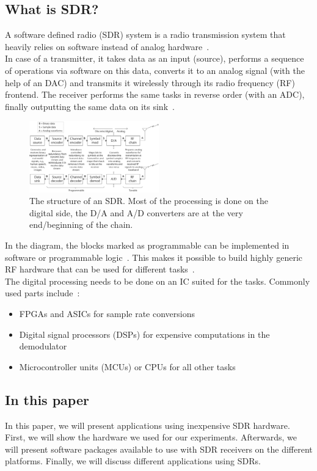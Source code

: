 \documentclass[conference]{IEEEtran}
\begin{document}
\subsection{What is SDR?}
A software defined radio (SDR) system is a radio transmission system that heavily relies on software instead of analog hardware~\cite{Heuberger2017}.\\
In case of a transmitter, it takes data as an input (source), performs a sequence of operations via software on this data, converts it to an analog signal (with the help of an DAC) and transmits it wirelessly through its radio frequency (RF) frontend. The receiver performs the same tasks in reverse order (with an ADC), finally outputting the same data on its sink~\cite[5pp]{wyglinski2018software}.
\begin{figure}[H]
	\centering
	\includegraphics[width=0.5\textwidth]{forEngineers_SDR_structure}
	\caption{The structure of an SDR. Most of the processing is done on the digital side, the D/A and A/D converters are at the very end/beginning of the chain.}
\end{figure}
In the diagram, the blocks marked as programmable can be implemented in software or programmable logic~\cite[5p]{wyglinski2018software}. This makes it possible to build highly generic RF hardware that can be used for different tasks~\cite[4p]{wyglinski2018software}.\\ 
The digital processing needs to be done on an IC suited for the tasks. Commonly used parts include~\cite[3p]{Heuberger2017}:
\begin{itemize}
	\item FPGAs and ASICs for sample rate conversions
	\item Digital signal processors (DSPs) for expensive computations in the demodulator
	\item Microcontroller units (MCUs) or CPUs for all other tasks
\end{itemize}
\subsection{In this paper}
In this paper, we will present applications using inexpensive SDR hardware.\\
First, we will show the hardware we used for our experiments. Afterwards, we will present software packages available to use with SDR receivers on the different platforms. Finally, we will discuss different applications using SDRs.
\end{document}
